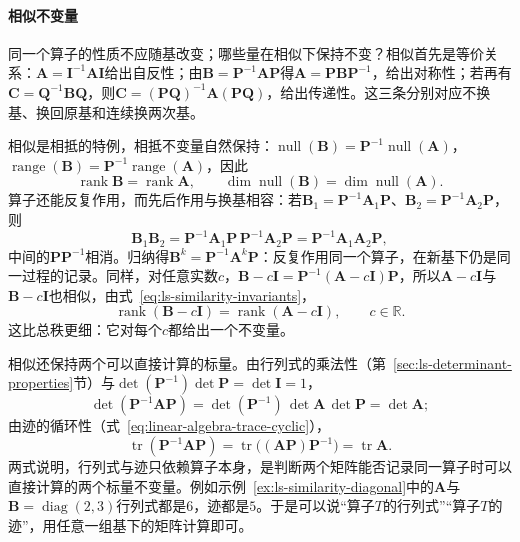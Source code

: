 \paragraph{相似不变量}
\label{sec:ls-similarity-properties}
同一个算子的性质不应随基改变；哪些量在相似下保持不变？相似首先是等价关系：$\bm A=\bm I^{-1}\bm A\bm I$给出自反性；由$\bm B=\bm P^{-1}\bm A\bm P$得$\bm A=\bm P\bm B\bm P^{-1}$，给出对称性；若再有$\bm C=\bm Q^{-1}\bm B\bm Q$，则$\bm C=(\bm P\bm Q)^{-1}\bm A(\bm P\bm Q)$，给出传递性。这三条分别对应不换基、换回原基和连续换两次基。

相似是相抵的特例，相抵不变量自然保持：$\operatorname{null}(\bm B)=\bm P^{-1}\operatorname{null}(\bm A)$，$\operatorname{range}(\bm B)=\bm P^{-1}\operatorname{range}(\bm A)$，因此
\begin{equation}
 \operatorname{rank}\bm B=\operatorname{rank}\bm A,
 \qquad
 \dim\operatorname{null}(\bm B)=\dim\operatorname{null}(\bm A).
 \label{eq:ls-similarity-invariants}
\end{equation}
算子还能反复作用，而先后作用与换基相容：若$\bm B_1=\bm P^{-1}\bm A_1\bm P$、$\bm B_2=\bm P^{-1}\bm A_2\bm P$，则
\begin{equation}
 \bm B_1\bm B_2
 =\bm P^{-1}\bm A_1\bm P\,\bm P^{-1}\bm A_2\bm P
 =\bm P^{-1}\bm A_1\bm A_2\bm P,
 \label{eq:ls-similarity-product}
\end{equation}
中间的$\bm P\bm P^{-1}$相消。归纳得$\bm B^k=\bm P^{-1}\bm A^k\bm P$：反复作用同一个算子，在新基下仍是同一过程的记录。同样，对任意实数$c$，$\bm B-c\bm I=\bm P^{-1}(\bm A-c\bm I)\bm P$，所以$\bm A-c\bm I$与$\bm B-c\bm I$也相似，由式~\eqref{eq:ls-similarity-invariants}，
\begin{equation}
 \operatorname{rank}(\bm B-c\bm I)=\operatorname{rank}(\bm A-c\bm I),\qquad c\in\mathbb R.
 \label{eq:ls-similarity-shifted-rank}
\end{equation}
这比总秩更细：它对每个$c$都给出一个不变量。

相似还保持两个可以直接计算的标量。由行列式的乘法性（第~\ref{sec:ls-determinant-properties}节）与$\det(\bm P^{-1})\det\bm P=\det\bm I=1$，
\[
 \det(\bm P^{-1}\bm A\bm P)=\det(\bm P^{-1})\,\det\bm A\,\det\bm P=\det\bm A;
\]
由迹的循环性（式~\eqref{eq:linear-algebra-trace-cyclic}），
\[
 \operatorname{tr}(\bm P^{-1}\bm A\bm P)=\operatorname{tr}\bigl((\bm A\bm P)\bm P^{-1}\bigr)=\operatorname{tr}\bm A.
\]
两式说明，行列式与迹只依赖算子本身，是判断两个矩阵能否记录同一算子时可以直接计算的两个标量不变量。例如示例~\ref{ex:ls-similarity-diagonal}中的$\bm A$与$\bm B=\operatorname{diag}(2,3)$行列式都是$6$，迹都是$5$。于是可以说“算子$T$的行列式”“算子$T$的迹”，用任意一组基下的矩阵计算即可。

